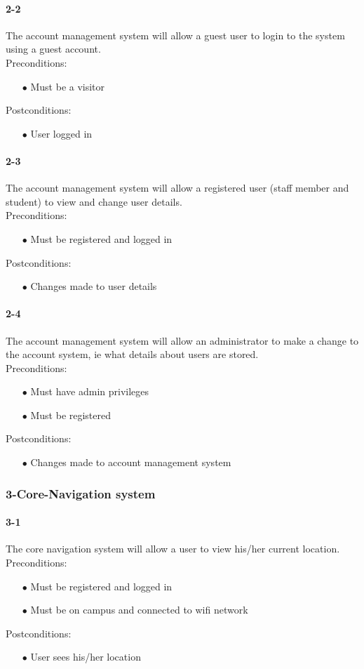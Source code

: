 \documentclass[a4paper,12pt]{article}
\begin{document}
\paragraph{2-2}
The account management system will allow a guest user to login to the system using a guest account.\\
Preconditions:
\begin{itemize}
	\item[$\bullet$] Must be a visitor
\end{itemize}
Postconditions:
\begin{itemize}
	\item[$\bullet$] User logged in
\end{itemize}
\paragraph{2-3}
The account management system will allow a registered user (staff member and student) to view and change user details.\\
Preconditions:
\begin{itemize}
	\item[$\bullet$] Must be registered and logged in
\end{itemize}
Postconditions:
\begin{itemize}
	\item[$\bullet$] Changes made to user details
\end{itemize}
\paragraph{2-4}
The account management system will allow an administrator to make a change to the account system, ie what details about users are stored.\\
Preconditions:
\begin{itemize}
	\item[$\bullet$] Must have admin privileges
	\item[$\bullet$] Must be registered
\end{itemize}
Postconditions:
\begin{itemize}
	\item[$\bullet$] Changes made to account management system
\end{itemize}
\subsubsection{3-Core-Navigation system}
\paragraph{3-1}
The core navigation system will allow a user to view his/her current location.\\
Preconditions:
\begin{itemize}
	\item[$\bullet$] Must be registered and logged in
	\item[$\bullet$] Must be on campus and connected to wifi network
\end{itemize}
Postconditions:
\begin{itemize}
	\item[$\bullet$] User sees his/her location
\end{itemize}
\end{document}
